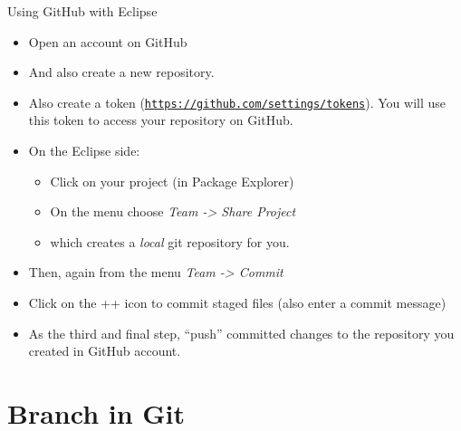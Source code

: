 \documentclass[aspectratio=169,11pt,t]{beamer}
\newcommand{\link}[1]{\textcolor{linkcol}{\underline{\texttt{#1}}}}
\newcommand{\dividerslide}[1]{%
  \begin{frame}[c]
    \centering{\LARGE\color{accent}#1\par}
  \end{frame}}
\begin{document}
\begin{frame}{Using GitHub with Eclipse}
  \small
  \begin{itemize}
    \item Open an account on GitHub
    \item And also create a new repository.
    \item Also create a token (\link{https://github.com/settings/tokens}). You will use this
          token to access your repository on GitHub.
    \item On the Eclipse side:
      \begin{itemize}
        \item Click on your project (in Package Explorer)
        \item On the menu choose \emph{Team -> Share Project}
        \item[] which creates a \emph{local} git repository for you.
      \end{itemize}
    \item Then, again from the menu \emph{Team -> Commit}
    \item Click on the ++ icon to commit staged files (also enter a commit message)
    \item As the third and final step, ``push'' committed changes to the repository you created
          in GitHub account.
  \end{itemize}
\end{frame}

\section{Branch in Git}
\dividerslide{Branch in Git}
\end{document}
